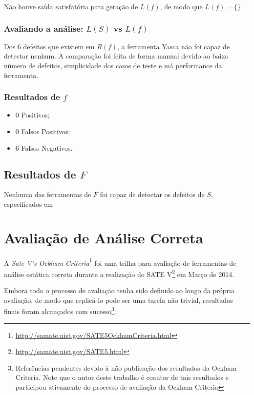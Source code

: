 Não houve saída satisfatória para geração de $L(f)$, de modo que 
$L(f) = \lbrace\rbrace$

\subsubsection{Avaliando a análise: $L(S)$ vs $L(f)$}

Dos 6 defeitos que existem em $R(f)$, a ferramenta Yasca não foi capaz de detectar nenhum. A comparação foi feita de forma manual devido ao baixo número de defeitos, simplicidade dos casos de teste e má performance da ferramenta.

\subsubsection{Resultados de $f$}

\begin{itemize}
  \item 0 Positivos;
  \item 0 Falsos Positivos;
  \item 6 Falsos Negativos.
\end{itemize}

\subsection{Resultados de $F$}

Nenhuma das ferramentas de $F$ foi capaz de detectar os defeitos de $S$, especificados em 

\section{Avaliação de Análise Correta}

A \textit{Sate V's Ockham Criteria}\footnote{\url{http://samate.nist.gov/SATE5OckhamCriteria.html}} foi uma trilha para avaliação de ferramentas de análise estática correta durante a realização do SATE V\footnote{\url{http://samate.nist.gov/SATE5.html}} em Março de 2014.

Embora todo o processo de avaliação tenha sido definido ao longo da própria avaliação, de modo que replicá-lo pode ser uma tarefa não trivial, resultados finais foram alcançados com sucesso\footnote{Referências pendentes devido à não publicação dos resultados da Ockham Criteria. Note que o autor deste trabalho é coautor de tais resultados e participou ativamente do processo de avaliação da Ockham Criteria}.

